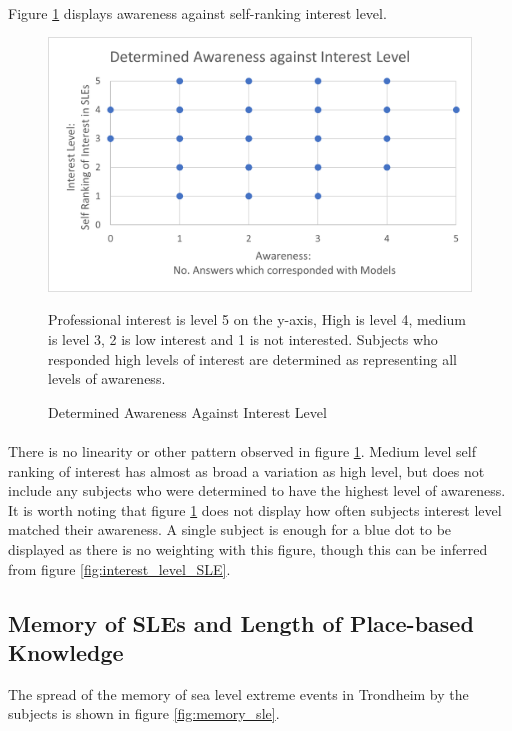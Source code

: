 \paragraph{}
Figure \ref{fig:aware_vs_interest} displays awareness against self-ranking interest level.

\begin{figure}[H]
    \centering
    \includegraphics{fig_results/aware_vs_interest.png}
    \caption{Determined Awareness Against Interest Level}{ Professional interest is level 5 on the y-axis, High  is level 4, medium is level 3, 2 is low interest and 1 is not interested. Subjects who responded high levels of interest are determined as representing all levels of awareness.}
    \label{fig:aware_vs_interest}
\end{figure}
\paragraph{}

There is no linearity or other pattern observed in figure \ref{fig:aware_vs_interest}. Medium level self ranking of interest has almost as broad a variation as high level, but does not include any subjects who were determined to have the highest level of awareness.  It is worth noting  that figure \ref{fig:aware_vs_interest} does not display how often subjects interest level matched their awareness. A single subject is enough for a blue dot to be displayed as there is no weighting with this figure, though this can be inferred from figure \ref{fig:interest_level_SLE}. 


\subsection{Memory of SLEs and Length of Place-based Knowledge}
The spread of the memory of sea level extreme events in Trondheim by the subjects is shown in figure \ref{fig:memory_sle}.


